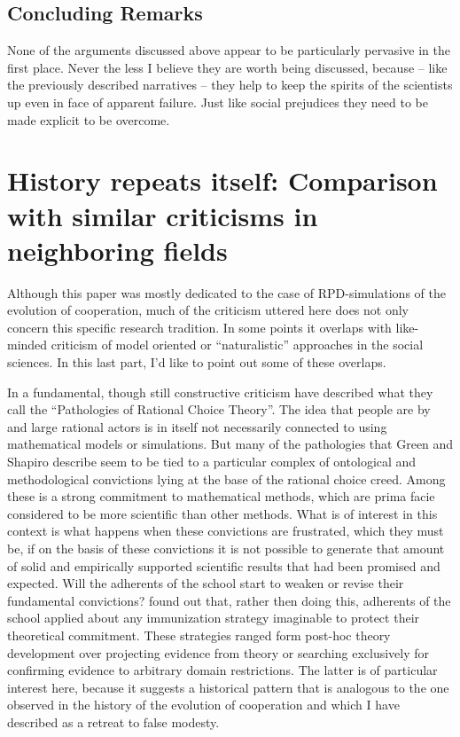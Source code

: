 \documentclass[graybox, English]{svmult}
\begin{document}
\subsection{Concluding Remarks}

None of the arguments discussed above appear to be particularly
pervasive in the first place. Never the less I believe they are worth
being discussed, because -- like the previously described
narratives -- they help to keep the spirits of the scientists up even
in face of apparent failure. Just like social prejudices they need to
be made explicit to be overcome.

\section{History repeats itself: Comparison with similar criticisms in neighboring fields}

Although this paper was mostly dedicated to the case of
RPD-simulations of the evolution of cooperation, much of the criticism
uttered here does not only concern this specific research
tradition. In some points it overlaps with like-minded criticism of
model oriented or ``naturalistic'' approaches in the social
sciences. In this last part, I'd like to point out some of these
overlaps. 

In a fundamental, though still constructive criticism
\citet{green-shapiro:1994} have described what they call the
``Pathologies of Rational Choice Theory''. The idea that people are by
and large rational actors is in itself not necessarily connected to
using mathematical models or simulations. But many of the pathologies
that Green and Shapiro describe seem to be tied to a particular
complex of ontological and methodological convictions lying at the
base of the rational choice creed. Among these is a strong commitment
to mathematical methods, which are prima facie considered to be more
scientific than other methods. What is of interest in this context is
what happens when these convictions are frustrated, which they must
be, if on the basis of these convictions it is not possible to
generate that amount of solid and empirically supported scientific
results that had been promised and expected. Will the adherents of the
school start to weaken or revise their fundamental convictions?
\citet[33ff.]{green-shapiro:1994} found out that, rather then doing
this, adherents of the school applied about any immunization strategy
imaginable to protect their theoretical commitment. These strategies
ranged form post-hoc theory development over projecting evidence from
theory or searching exclusively for confirming evidence to arbitrary
domain restrictions. The latter is of particular interest here,
because it suggests a historical pattern that is analogous to the one
observed in the history of the evolution of cooperation and which I
have described as a retreat to false modesty.
\end{document}

